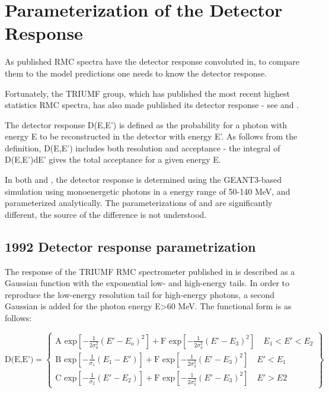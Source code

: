 \section { Parameterization of the Detector Response}

As published RMC spectra have the detector response convoluted in, to compare
them to the model predictions one needs to know the detector response.

Fortunately, the TRIUMF group, which has published the most recent highest statistics
RMC spectra, has also made published its detector response -
see \cite{RMC_1992_PhysRevC.46.1094} and \cite{RMC_1998_PhysRevC.58.1767}. 

The detector response D(E,E') is defined as the probability for a photon
with energy E to be reconstructed in the detector with energy E'. As follows from the
definition, D(E,E') includes both resolution and acceptance - the integral of D(E,E')dE'
gives the total acceptance for a given energy E.

In both \cite{RMC_1992_PhysRevC.46.1094} and \cite{RMC_1998_PhysRevC.58.1767}, the
detector response is determined using the GEANT3-based simulation using monoenergetic
photons in a energy range of 50-140 MeV, and parameterized analytically.
The parameterizations of  \cite{RMC_1992_PhysRevC.46.1094} and \cite{RMC_1998_PhysRevC.58.1767}
are significantly different, the source of the difference is not understood.

\subsection { 1992 Detector response parametrization }

The response of the TRIUMF RMC spectrometer published in \cite{RMC_1992_PhysRevC.46.1094}
is described as a Gaussian function with the exponential low- and  high-energy tails.
In order to reproduce the low-energy resolution tail for high-energy photons, a second Gaussian
is added for the photon energy E>60 MeV. The functional form is as follows:

\begin{equation}
  \label{eq:001}
\text{D(E,E')}= \left\{
\begin{array}{ll}
                \text{A exp}\left[-\frac{1}{2\sigma_0^2}(E'-E_o)^2\right]+
                \text{F exp}\left[-\frac{1}{2\sigma_3^2}(E'-E_3)^2\right]
 \quad E_1<E'<E_2 \\
                \text{B exp}\left[-\frac{1}{\sigma_1}(E_1-E') \right]+
                \text{F exp}\left[-\frac{1}{2\sigma_3^2}(E'-E_3)^2\right]
 \quad E'<E_1      \\  
                \text{C exp}\left[-\frac{1}{\sigma_2}(E'-E_2)\right]+
                \text{F exp}\left[-\frac{1}{2\sigma_3^2}(E'-E_3)^2\right]
 \quad E'>E2     
 \end{array}
 \right\}
\end{equation}
 
